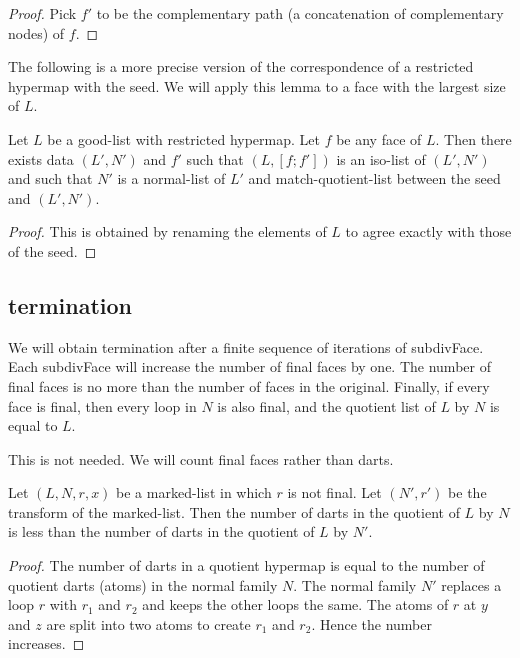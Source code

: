 \begin{proof} Pick $f'$ to be the complementary path (a concatenation of complementary nodes) of $f$.
\end{proof}

The following is a more precise version of the correspondence of a restricted hypermap with
the seed.  We will apply this lemma to a face with the largest size of $L$.

\begin{lemma}  Let $L$ be a good-list with restricted hypermap.   Let $f$ be any face of $L$.  Then there exists data $(L',N')$ and $f'$
such that $(L,[f;f'])$ is an iso-list of $(L',N')$ and such that $N'$ is a normal-list of $L'$ and
match-quotient-list between the seed and $(L',N')$.
\end{lemma}

\begin{proof} This is obtained by renaming the elements of $L$ to agree exactly with those of the seed.
\end{proof}

\subsection{termination}

We will obtain termination after a finite sequence of iterations of subdivFace.  Each subdivFace
will increase the number of final faces by one.  The number of final faces
 is no more than the number of faces in the original.  Finally,
if every face  is final, then every loop in $N$ is also final, and the quotient list of $L$ by $N$ is equal to $L$.

This is not needed. We will count final faces rather than darts.

\begin{lemma}  Let $(L,N,r,x)$ be a marked-list in which $r$ is not final.
Let $(N',r')$ be the transform of the marked-list.  Then the number of darts in the
quotient of $L$ by $N$ is less than the number of darts in the quotient of $L$ by $N'$.
\end{lemma}

\begin{proof}  The number of darts in a quotient hypermap is equal
to the number of quotient darts (atoms) in the normal family $N$.
The normal family $N'$ replaces a loop $r$ with $r_1$ and $r_2$
and keeps the other loops the same.  The atoms of $r$ at
$y$ and $z$ are split into two atoms to create $r_1$ and $r_2$.
Hence the number increases.
\end{proof}


